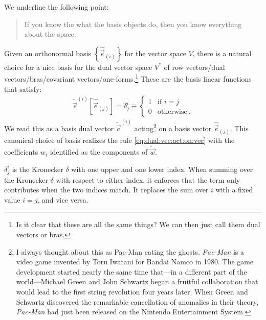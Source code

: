 \documentclass[
  11pt,
	colorful,
	raggedright,
]{tufte-style-thesis-flip}
\begin{document}
We underline the following point:
\begin{quote}
If you know the what the basis objects do, then you know everything about the space.
\end{quote}
Given an orthonormal basis $\left\{\hat{\vec{e}}_{(i)}\right\}$ for the vector space $V$, there is a natural choice for a nice basis for the dual vector space $V^*$ of row vectors/dual vectors/bras/covariant vectors/one-forms.\footnote{Is it clear that these are all the same things? We can then just call them dual vectors or bras.} These are the basis linear functions that satisfy:
\begin{align}
  \tilde{\vec e}^{(i)} \left[\hat{\vec{e}}_{(j)}\right] = \delta^i_j
  \equiv
  \begin{cases}
  1 &\text{if } i=j\\
  0 &\text{otherwise} \ .
  \end{cases}
  \label{eq:canonical:dual:basis}
\end{align}
We read this as a basis dual vector $\tilde{\vec e}^{(i)}$ acting\footnote{I always thought about this as Pac-Man eating the ghosts. \emph{Pac-Man} is a video game invented by Toru Iwatani for Bandai Namco in 1980. The game development started nearly the same time that---in a different part of the world---Michael Green and John Schwartz began a fruitful collaboration that would lead to the first string revolution four years later. When Green and Schwartz discovered the remarkable cancellation of anomalies in their theory, \emph{Pac-Man} had just been released on the Nintendo Entertainment System.} on a basis vector $\hat{\vec{e}}_{(j)}$.
This canonical choice of basis realizes the rule \eqref{eq:dual:vec:act:on:vec} with the coefficients $w_i$ identified as the components of $\tilde{\vec w}$.

$\delta^i_j$ is the Kronecker $\delta$ with one upper and one lower index. When summing over the Kronecker $\delta$ with respect to either index, it enforces that the term only contributes when the two indices match. It replaces the sum over $i$ with a fixed value $i=j$, and vice versa.
\end{document}
